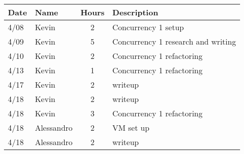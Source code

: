 
\begin{tabular}{l l c p{1.1in}}\textbf{Date} & \textbf{Name} & \textbf{Hours} & \textbf{Description}\\\hline
4/08 & Kevin & 2 & Concurrency 1 setup\\\hline
4/09 & Kevin & 5 & Concurrency 1 research and writing\\\hline
4/10 & Kevin & 2 & Concurrency 1 refactoring\\\hline
4/13 & Kevin & 1 & Concurrency 1 refactoring\\\hline
4/17 & Kevin & 2 & writeup\\\hline
4/18 & Kevin & 2 & writeup\\\hline
4/18 & Kevin & 3 & Concurrency 1 refactoring\\\hline
4/18 & Alessandro & 2 & VM set up\\\hline
4/18 & Alessandro & 2 & writeup\\\hline
\end{tabular}